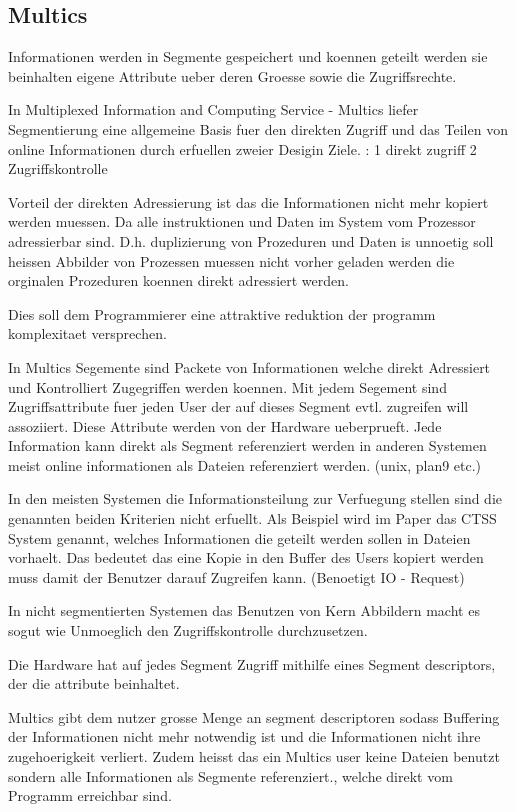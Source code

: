 \documentclass[9pt,technote]{IEEEtran}
\begin{document}
   \subsection{Multics}  
   
   Informationen werden in Segmente gespeichert und koennen geteilt werden sie beinhalten eigene Attribute 
   ueber deren Groesse sowie die Zugriffsrechte.
   
   In Multiplexed Information and Computing Service - Multics  liefer Segmentierung eine allgemeine Basis fuer den direkten Zugriff
   und das Teilen von online Informationen durch erfuellen zweier Desigin Ziele. : 1 direkt zugriff 2 Zugriffskontrolle
   
   Vorteil der direkten Adressierung ist das die Informationen nicht mehr kopiert werden muessen. Da alle instruktionen und Daten
   im System vom Prozessor adressierbar sind. D.h. duplizierung von Prozeduren und Daten is unnoetig soll heissen Abbilder von Prozessen muessen
   nicht vorher geladen werden die orginalen Prozeduren koennen direkt adressiert werden.
   
  Dies soll dem Programmierer eine attraktive reduktion der programm komplexitaet versprechen.
  
  In Multics Segemente sind Packete von Informationen welche direkt Adressiert und Kontrolliert Zugegriffen werden koennen.
  Mit jedem Segement sind Zugriffsattribute fuer jeden User der auf dieses Segment evtl. zugreifen will assoziiert.
  Diese Attribute werden von der Hardware ueberprueft. Jede Information kann direkt als Segment referenziert werden
  in anderen Systemen meist online informationen als Dateien referenziert werden. (unix, plan9 etc.)
  
  In den meisten Systemen die Informationsteilung zur Verfuegung stellen sind die genannten beiden Kriterien nicht erfuellt.
  Als Beispiel wird im Paper \cite{inproc:multics} das CTSS System genannt, welches Informationen die geteilt werden sollen in Dateien vorhaelt.
  Das bedeutet das eine Kopie in den Buffer des Users kopiert werden muss damit der Benutzer darauf Zugreifen kann. (Benoetigt IO - Request)
  
  In nicht segmentierten Systemen das Benutzen von Kern Abbildern macht es sogut wie Unmoeglich den Zugriffskontrolle durchzusetzen.
  
 Die Hardware hat auf jedes Segment Zugriff mithilfe eines Segment descriptors, der die attribute beinhaltet.
 
 Multics gibt dem nutzer grosse Menge an segment descriptoren sodass Buffering der Informationen nicht mehr notwendig ist und die Informationen nicht
 ihre zugehoerigkeit verliert. Zudem heisst das ein Multics user keine Dateien benutzt sondern alle Informationen als Segmente referenziert., welche direkt vom Programm erreichbar sind.
 
\end{document}
